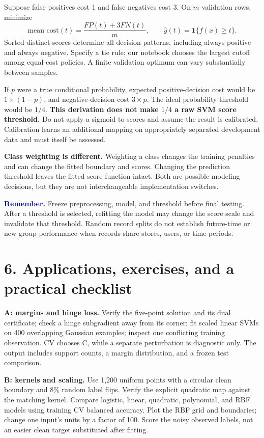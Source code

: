 \documentclass[11pt,a4paper]{article}
\newcommand{\idea}[1]{\textcolor{navy}{\textbf{Remember.}} #1}
\begin{document}
Suppose false positives cost 1 and false negatives cost 3. On $m$ validation rows, minimize
\[
\boxed{\text{mean cost}(t)=\frac{FP(t)+3FN(t)}m,\qquad
\hat y(t)=\mathbf1\{f(x)\ge t\}.}
\]
Sorted distinct scores determine all decision patterns, including always positive and always negative.
Specify a tie rule; our notebook chooses the largest cutoff among equal-cost policies.
A finite validation optimum can vary substantially between samples.

If $p$ were a true conditional probability, expected positive-decision cost would be $1\times(1-p)$,
and negative-decision cost $3\times p$. The ideal probability threshold would be $1/4$.
\textbf{This derivation does not make $1/4$ a raw SVM score threshold.}
Do not apply a sigmoid to scores and assume the result is calibrated. Calibration learns an additional mapping
on appropriately separated development data and must itself be assessed.

\textbf{Class weighting is different.} Weighting a class changes the training penalties and can change the fitted
boundary and scores. Changing the prediction threshold leaves the fitted score function intact.
Both are possible modeling decisions, but they are not interchangeable implementation switches.

\idea{Freeze preprocessing, model, and threshold before final testing. After a threshold is selected,
refitting the model may change the score scale and invalidate that threshold. Random record splits do not
establish future-time or new-group performance when records share stores, users, or time periods.}

\newpage
\section*{6. Applications, exercises, and a practical checklist}
\textbf{A: margins and hinge loss.} Verify the five-point solution and its dual certificate;
check a hinge subgradient away from its corner; fit scaled linear SVMs on 400 overlapping Gaussian examples;
inspect one conflicting training observation. CV chooses C, while a separate perturbation is diagnostic only.
The output includes support counts, a margin distribution, and a frozen test comparison.

\textbf{B: kernels and scaling.} Use 1,200 uniform points with a circular clean boundary and 8\% random label flips.
Verify the explicit quadratic map against the matching kernel. Compare logistic, linear, quadratic, polynomial,
and RBF models using training CV balanced accuracy. Plot the RBF grid and boundaries; change one input's units
by a factor of 100. Score the noisy observed labels, not an easier clean target substituted after fitting.
\end{document}
